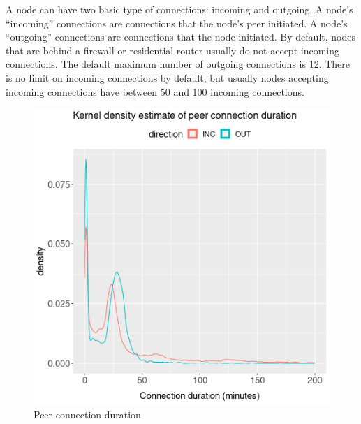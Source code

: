 \documentclass[usletter,11pt,english,openany]{article}
\begin{document}
A node can have two basic type of connections: incoming and outgoing.
A node's ``incoming'' connections are connections that the node's
peer initiated. A node's ``outgoing'' connections are connections
that the node initiated. By default, nodes that are behind a firewall
or residential router usually do not accept incoming connections.
The default maximum number of outgoing connections is 12. There is
no limit on incoming connections by default, but usually nodes accepting
incoming connections have between 50 and 100 incoming connections. 

\begin{figure}%

\caption{Peer connection duration}

\label{fig-p2p-connection-duration}
\begin{centering}
\includegraphics[scale=0.5]{images/p2p-connection-duration}
\par\end{centering}
\end{figure}%
 \begin{table}%
\end{table}%
\end{document}
